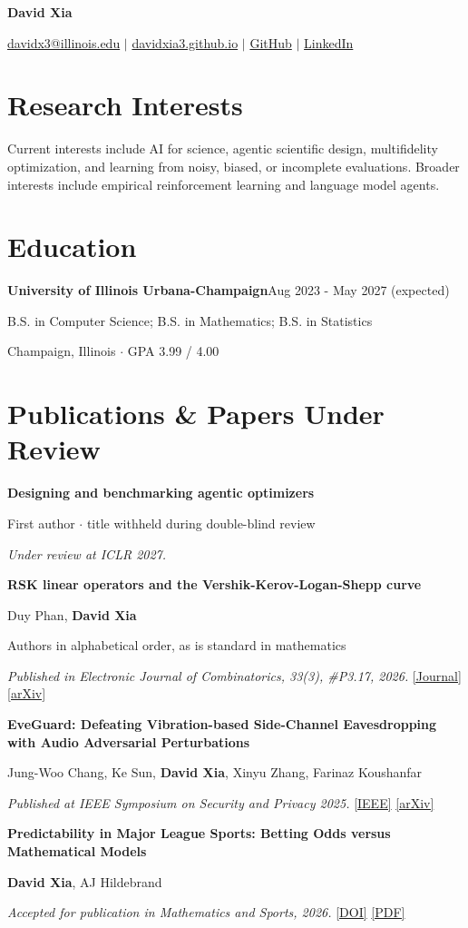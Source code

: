 \documentclass[letterpaper,11pt]{article}
\newcommand{\paper}[4]{\par\addvspace{7pt}\textbf{#1}\par #2\par\textit{#3} #4\par}
\begin{document}
{\centering
{\LARGE\bfseries David Xia}\par\vspace{5pt}
\href{mailto:davidx3@illinois.edu}{davidx3@illinois.edu} $\vert$
\href{https://davidxia3.github.io/}{davidxia3.github.io} $\vert$
\href{https://github.com/davidxia3}{GitHub} $\vert$
\href{https://www.linkedin.com/in/dx3/}{LinkedIn}\par}
\section{Research Interests}
Current interests include AI for science, agentic scientific design, multifidelity optimization, and learning from noisy, biased, or incomplete evaluations. Broader interests include empirical reinforcement learning and language model agents.
\section{Education}
\textbf{University of Illinois Urbana-Champaign}\hfill Aug 2023 - May 2027 (expected)\par
B.S. in Computer Science; B.S. in Mathematics; B.S. in Statistics\par
Champaign, Illinois $\cdot$ GPA 3.99 / 4.00
\section{Publications \& Papers Under Review}
\paper{Designing and benchmarking agentic optimizers}
{First author $\cdot$ title withheld during double-blind review}
{Under review at ICLR 2027.}
{}
\paper{RSK linear operators and the Vershik-Kerov-Logan-Shepp curve}
{Duy Phan, \textbf{David Xia}\par Authors in alphabetical order, as is standard in mathematics}
{Published in Electronic Journal of Combinatorics, 33(3), \#P3.17, 2026.}
{\href{https://www.combinatorics.org/ojs/index.php/eljc/article/view/v33i3p17}{[Journal]} \href{https://arxiv.org/abs/2504.05510}{[arXiv]}}
\paper{EveGuard: Defeating Vibration-based Side-Channel Eavesdropping with Audio Adversarial Perturbations}
{Jung-Woo Chang, Ke Sun, \textbf{David Xia}, Xinyu Zhang, Farinaz Koushanfar}
{Published at IEEE Symposium on Security and Privacy 2025.}
{\href{https://ieeexplore.ieee.org/document/11023366/}{[IEEE]} \href{https://arxiv.org/abs/2411.10034}{[arXiv]}}
\paper{Predictability in Major League Sports: Betting Odds versus Mathematical Models}
{\textbf{David Xia}, AJ Hildebrand}
{Accepted for publication in Mathematics and Sports, 2026.}
{\href{https://doi.org/10.5149/ms.4631}{[DOI]} \href{https://davidxia3.github.io/docs/predictability_paper.pdf}{[PDF]}}
\end{document}

